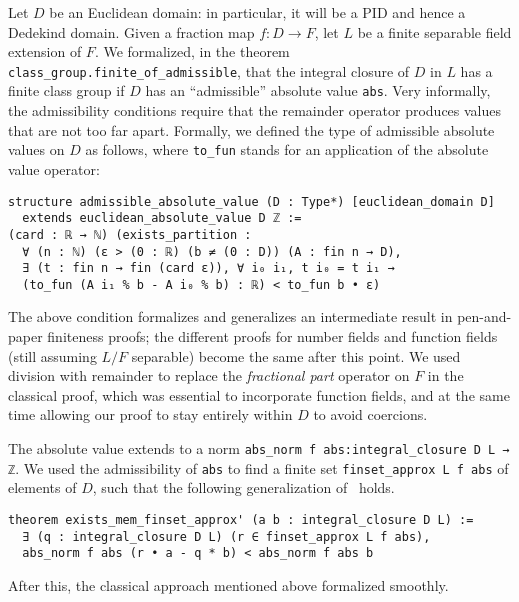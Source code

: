 \documentclass[a4paper,USenglish,cleveref, autoref, thm-restate]{lipics-v2021}
\newcommand{\lean}[1]{\texttt{#1}\xspace} %
\begin{document}
Let $D$ be an Euclidean domain: in particular, it will be a PID and hence a Dedekind domain. Given a fraction map $f \colon D \to F$, let $L$ be a finite separable field extension of $F$.
We formalized, in the theorem \lean{class\_group.finite\_of\_admissible}, that the integral closure of $D$ in $L$ has a finite class group if $D$ has an ``admissible'' absolute value \lean{abs}.
Very informally, the admissibility conditions require that the remainder operator produces values that are not too far apart.
Formally, we defined the type of admissible absolute values on $D$ as follows, where \lean{to\_fun} stands for an application of the absolute value operator:
\pagebreak[3] %
\begin{lstlisting}
structure admissible_absolute_value (D : Type*) [euclidean_domain D]
  extends euclidean_absolute_value D ℤ :=
(card : ℝ → ℕ) (exists_partition :
  ∀ (n : ℕ) (ε > (0 : ℝ) (b ≠ (0 : D)) (A : fin n → D),
  ∃ (t : fin n → fin (card ε)), ∀ i₀ i₁, t i₀ = t i₁ →
  (to_fun (A i₁ % b - A i₀ % b) : ℝ) < to_fun b • ε)
\end{lstlisting}

The above condition formalizes and generalizes an intermediate result in pen-and-paper finiteness proofs;
the different proofs for number fields and function fields (still assuming $L/F$ separable) become the same after this point.
We used division with remainder to replace the \emph{fractional part} operator on $F$ in the classical proof, which was essential to incorporate function fields, and at the same time allowing our proof to stay entirely within $D$ to avoid coercions.

The absolute value extends to a norm \lean{abs\_norm f abs:integral\_closure D L → ℤ}.
We used the admissibility of \lean{abs} to find a finite set \lean{finset\_approx L f abs} of elements of $D$,
such that the following generalization of~\cite[Theorem~12.2.1]{Ireland-Rosen} holds.
\begin{lstlisting}
theorem exists_mem_finset_approx' (a b : integral_closure D L) :=
  ∃ (q : integral_closure D L) (r ∈ finset_approx L f abs),
  abs_norm f abs (r • a - q * b) < abs_norm f abs b
\end{lstlisting}
After this, the classical approach mentioned above formalized smoothly.
\end{document}
